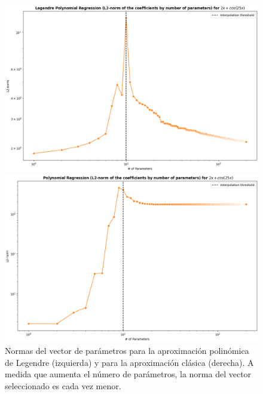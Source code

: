 \begin{figure}[htbp]
    \centering
    \begin{minipage}{0.4\textwidth}
        \centering
        \includegraphics[width=\linewidth]{img/experiments/legendre1.4.png}
    \end{minipage}
    \hfill
    \begin{minipage}{0.4\textwidth}
        \centering
        \includegraphics[width=\linewidth]{img/experiments/OLS1.4.png}
    \end{minipage}
    \caption[Normas del vector de parámetros para las aproximaciones polinómicas.]{Normas del vector de parámetros para la aproximación polinómica de Legendre (izquierda) y para la aproximación clásica (derecha). A medida que aumenta el número de parámetros, la norma del vector seleccionado es cada vez menor.}\label{fig:legendreandclassicDD}
\end{figure}


